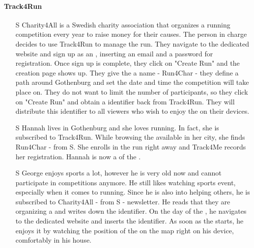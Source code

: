 \documentclass[../../../rasd.tex]{subfiles}
\begin{document}
                \paragraph{Track4Run}
                \begin{itemize}
                    \item[S\subs{8}] Charity4All is a Swedish charity association that organizes a running competition every year to raise money for their causes. The person in charge decides to use Track4Run to manage the run. They navigate to the  dedicated website and sign up as an , inserting an email and a password for registration. Once sign up is complete, they click on "Create Run" and the  creation page shows up. They give the  a name - Run4Char - they define a path around Gothenburg and set the date and time the competition will take place on. They do not want to limit the number of participants, so they click on "Create Run" and obtain a  identifier back from Track4Run. They will distribute this identifier to all viewers who wish to enjoy the  on their devices.

                    \item[S\subs{9}] Hannah lives in Gothenburg and she loves running. In fact, she is subscribed to Track4Run. While browsing the available  in her city, she finds Run4Char - from S. She enrolls in the run right away and Track4Me records her registration. Hannah is now a  of the .  

                    \item[S\subs{10}] George enjoys sports a lot, however he is very old now and cannot participate in competitions anymore. He still likes watching sports event, especially when it comes to running. Since he is also into helping others, he is subscribed to Charity4All - from S - newsletter. He reads that they are organizing a  and writes down the  identifier. On the day of the , he navigates to the  dedicated website and inserts the  identifier. As soon as the  starts, he enjoys it by watching the position of the  on the map right on his device, comfortably in his house.
                \end{itemize}
\end{document}
